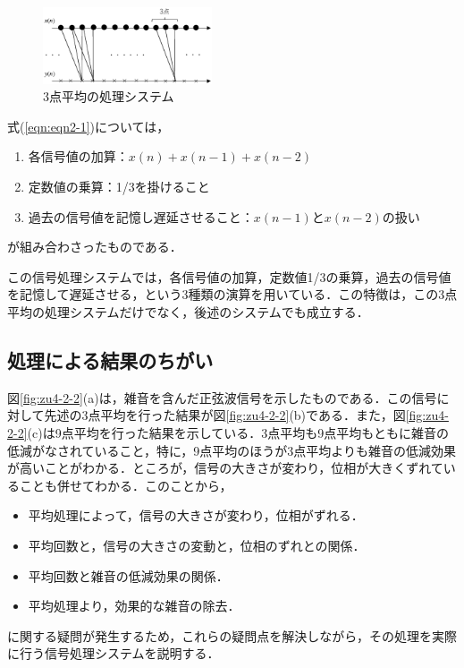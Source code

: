 \begin{figure}[H]
\begin{center}
\includegraphics[width=5cm]{fig/zu-2-1.eps}
\end{center}
\caption{3点平均の処理システム}
\label{fig:zu4-2-1}
\end{figure}
式(\ref{eqn:eqn2-1})については，
\begin{enumerate}
	\item 各信号値の加算：$x(n)+x(n-1)+x(n-2)$

	\item 定数値の乗算：1/3を掛けること

	\item 過去の信号値を記憶し遅延させること：$x(n-1)$と$x(n-2)$の扱い
\end{enumerate}
が組み合わさったものである．

この信号処理システムでは，各信号値の加算，定数値1/3の乗算，過去の信号値を記憶して遅延させる，という3種類の演算を用いている．この特徴は，この3点平均の処理システムだけでなく，後述のシステムでも成立する．

\subsection{処理による結果のちがい}

図\ref{fig:zu4-2-2}(a)は，雑音を含んだ正弦波信号を示したものである．この信号に対して先述の3点平均を行った結果が図\ref{fig:zu4-2-2}(b)である．また，図\ref{fig:zu4-2-2}(c)は9点平均を行った結果を示している．3点平均も9点平均もともに雑音の低減がなされていること，特に，9点平均のほうが3点平均よりも雑音の低減効果が高いことがわかる．ところが，信号の大きさが変わり，位相が大きくずれていることも併せてわかる．このことから，
\begin{itemize}
\item 平均処理によって，信号の大きさが変わり，位相がずれる．
\item 平均回数と，信号の大きさの変動と，位相のずれとの関係．
\item 平均回数と雑音の低減効果の関係．
\item 平均処理より，効果的な雑音の除去．
\end{itemize}
に関する疑問が発生するため，これらの疑問点を解決しながら，その処理を実際に行う信号処理システムを説明する．

